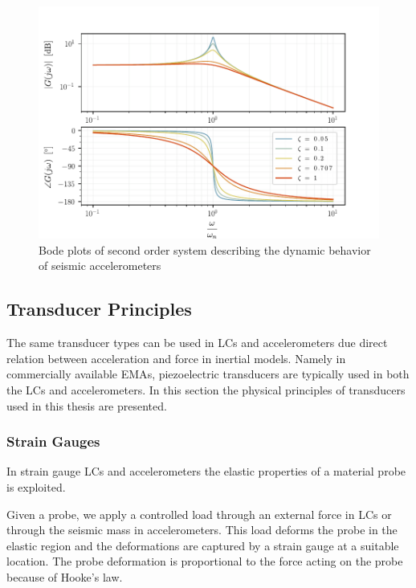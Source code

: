 \begin{figure}[!htb]
  \centering
  \includegraphics[scale=0.8]{figures/measurement/accel/seismic_accelerometer_edited}
  \caption[Second-Order System Bode plots]{Bode plots of second order system describing the dynamic behavior of seismic accelerometers%
    \label{fig:seismic_accelerometer_edited}}
\end{figure}

\subsection{Transducer Principles}

The same transducer types can be used in \ac{LC}s and accelerometers due direct relation between acceleration and force in inertial models. Namely in commercially available \ac{EMA}s, piezoelectric transducers are typically used in both the \ac{LC}s and accelerometers. In this section the physical principles of transducers used in this thesis are presented.

\subsubsection{Strain Gauges}

In strain gauge \ac{LC}s and accelerometers the elastic properties of a material probe is exploited.

Given a probe, we apply a controlled load through an external force in \ac{LC}s or through the seismic mass in accelerometers. This load deforms the probe in the elastic region and the deformations are captured by a strain gauge at a suitable location. The probe deformation is proportional to the force acting on the probe because of Hooke's law.

